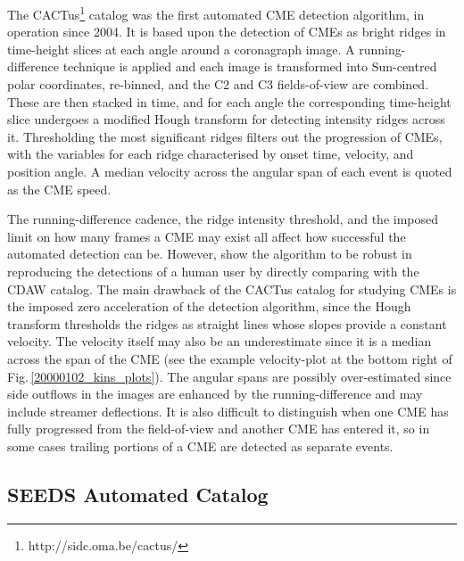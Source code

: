 \documentclass[referee,a4paper,12pt,traditabstract]{swsc}
\begin{document}
\begin{linenumbers}
The CACTus\footnote{http://sidc.oma.be/cactus/} catalog was the first automated CME detection algorithm, in operation since 2004. It is based upon the detection of CMEs as bright ridges in time-height slices at each angle around a coronagraph image. A running-difference technique is applied and each image is transformed into Sun-centred polar coordinates, re-binned, and the C2 and C3 fields-of-view are combined. These are then stacked in time, and for each angle the corresponding time-height slice undergoes a modified Hough transform for detecting intensity ridges across it. Thresholding the most significant ridges filters out the progression of CMEs, with the variables for each ridge characterised by onset time, velocity, and position angle. A median velocity across the angular span of each event is quoted as the CME speed.

The running-difference cadence, the ridge intensity threshold, and the imposed limit on how many frames a CME may exist all affect how successful the automated detection can be. However, \citet{2004A&A...425.1097R} show the algorithm to be robust in reproducing the detections of a human user by directly comparing with the CDAW catalog. The main drawback of the CACTus catalog for studying CMEs is the imposed zero acceleration of the detection algorithm, since the Hough transform thresholds the ridges as straight lines whose slopes provide a constant velocity. The velocity itself may also be an underestimate since it is a median across the span of the CME (see the example velocity-plot at the bottom right of Fig.\,\ref{20000102_kins_plots}). The angular spans are possibly over-estimated since side outflows in the images are enhanced by the running-difference and may include streamer deflections. It is also difficult to distinguish when one CME has fully progressed from the field-of-view and another CME has entered it, so in some cases trailing portions of a CME are detected as separate events.

\subsection{SEEDS Automated Catalog}


\end{linenumbers}
\end{document}
